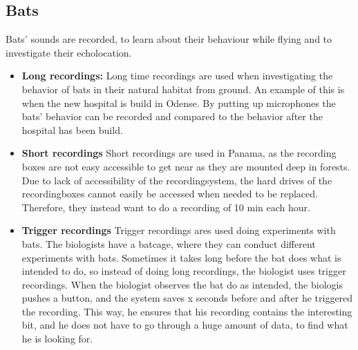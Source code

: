 \subsection{Bats}
Bats' sounds are recorded, to learn about their behaviour while flying and to investigate their echolocation. 


\begin{itemize}
	\item \textbf{Long recordings:} Long time recordings are used when investigating the behavior of bats in their natural habitat from ground. An example of this is when the new hospital is build in Odense. By putting up microphones the bats’ behavior can be recorded and compared to the behavior after the hospital has been build.
	
	 \item \textbf{Short recordings} Short recordings are used in Panama, as the recording boxes are not easy accessible to get near as they are mounted deep in forests. Due to lack of accessibility of the recordingsystem, the hard drives of the recordingboxes cannot easily be accessed when needed to be replaced. Therefore, they instead want to do a recording of 10 min each hour.

	\item \textbf{Trigger recordings} Trigger recordings ares used doing experiments with bats. The biologists have a batcage, where they can conduct different experiments with bats. Sometimes it takes long before the bat does what is intended to do, so instead of doing long recordings, the biologist uses trigger recordings. When the biologist observes the bat do as intended, the biologis pushes a button, and the system saves x seconds before and after he triggered the recording. This way, he ensures that his recording contains the interesting bit, and he does not have to go through a huge amount of data, to find what he is looking for.
\end{itemize}

